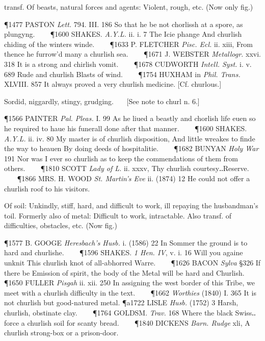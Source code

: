 \begin{description}[wide, labelwidth=!, labelindent=0pt]
\begin{myenumerate}
 transf. Of beasts, natural forces and agents: Violent, rough, etc. (Now only fig.)

\P 1477 PASTON  \textit{Lett.} 794. III. 186 So that he be not chorlissh at a spore, as plungyng.    
\P 1600 SHAKES.  \textit{A.Y.L.} ii. i. 7 The Icie phange And churlish chiding of the winters winde.    
\P 1633 P. FLETCHER  \textit{Pisc. Ecl.} ii. xiii, From thence he furrow'd many a churlish sea.    
\P 1671 J. WEBSTER  \textit{Metallogr.} xxvi. 318 It is a strong and chirlish vomit.    
\P 1678 CUDWORTH  \textit{Intell. Syst.} i. v. 689 Rude and churlish Blasts of wind.    
\P 1754 HUXHAM in \textit{Phil. Trans.} XLVIII. 857 It always proved a very churlish medicine. [Cf. churlous.]

 Sordid, niggardly, stingy, grudging.
   [See note to churl n. 6.]

\P 1566 PAINTER  \textit{Pal. Pleas.} I. 99 As he liued a beastly and chorlish life euen so he required to haue his funerall done after that manner.    
\P 1600 SHAKES.  \textit{A.Y.L.} ii. iv. 80 My master is of churlish disposition, And little wreakes to finde the way to heauen By doing deeds of hospitalitie.    
\P 1682 BUNYAN  \textit{Holy War} 191 Nor was I ever so churlish as to keep the commendations of them from others.    
\P 1810 SCOTT  \textit{Lady of L.} ii. xxxv, Thy churlish courtesy‥Reserve.    
\P 1866 MRS. H. WOOD  \textit{St. Martin's Eve} ii. (1874) 12 He could not offer a churlish roof to his visitors.

 Of soil: Unkindly, stiff, hard, and difficult to work, ill repaying the husbandman's toil. Formerly also of metal: Difficult to work, intractable. Also transf. of difficulties, obstacles, etc. (Now fig.)

\P 1577 B. GOOGE  \textit{Heresbach's Husb.} i. (1586) 22 In Sommer the ground is to hard and churlishe.    
\P 1596 SHAKES.  \textit{1 Hen. IV}, v. i. 16 Will you againe unknit This churlish knot of all-abhorred Warre.    
\P 1626 BACON  \textit{Sylva} §326 If there be Emission of spirit, the body of the Metal will be hard and Churlish.    
\P 1650 FULLER  \textit{Pisgah} ii. xii. 250 In assigning the west border of this Tribe, we meet with a churlish difficulty in the text.    
\P 1662 \textit{Worthies} (1840) I. 365 It is not churlish but good-natured metal.
\P a1722 LISLE  \textit{Husb.} (1752) 3 Harsh, churlish, obstinate clay.    
\P 1764 GOLDSM.  \textit{Trav.} 168 Where the black Swiss‥force a churlish soil for scanty bread.    
\P 1840 DICKENS  \textit{Barn. Rudge} xli, A churlish strong-box or a prison-door.


\end{myenumerate}
\end{description}
